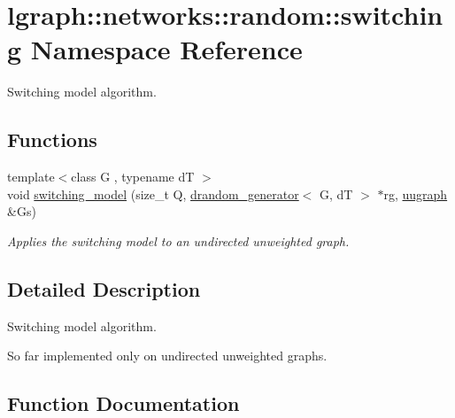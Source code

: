\hypertarget{namespacelgraph_1_1networks_1_1random_1_1switching}{}\section{lgraph\+:\+:networks\+:\+:random\+:\+:switching Namespace Reference}
\label{namespacelgraph_1_1networks_1_1random_1_1switching}


Switching model algorithm.  


\subsection*{Functions}
\begin{DoxyCompactItemize}
\item 
{\footnotesize template$<$class G , typename dT $>$ }\\void \hyperlink{namespacelgraph_1_1networks_1_1random_1_1switching_a2e67b3dcbe084a54ba92a05066a10abc}{switching\+\_\+model} (size\+\_\+t Q, \hyperlink{classlgraph_1_1utils_1_1drandom__generator}{drandom\+\_\+generator}$<$ G, dT $>$ $\ast$rg, \hyperlink{classlgraph_1_1utils_1_1uugraph}{uugraph} \&Gs)
\begin{DoxyCompactList}\small\item\em Applies the switching model to an undirected unweighted graph. \end{DoxyCompactList}\end{DoxyCompactItemize}


\subsection{Detailed Description}
Switching model algorithm. 

So far implemented only on undirected unweighted graphs. 

\subsection{Function Documentation}
